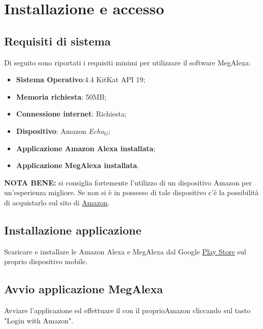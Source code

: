 \chapter{Installazione e accesso}


\section{Requisiti di sistema}
\label{Requisiti sistema}
Di seguito sono riportati i requisiti minimi per utilizzare il software MegAlexa:

\begin{itemize}
	\item \textbf{Sistema Operativo}:4.4 KitKat API 19;
	\item \textbf{Memoria richiesta}: 50MB;
	\item \textbf{Connessione internet}: Richiesta;
	\item \textbf{Dispositivo}: Amazon \textit{Echo$_{G}$};
	\item \textbf{Applicazione Amazon Alexa installata};
	\item \textbf{Applicazione MegAlexa installata}.
\end{itemize}

\textbf{NOTA BENE:} si consiglia fortemente l'utilizzo di un dispositivo Amazon per un'esperienza migliore. Se non si è in possesso di tale dispositivo c'è la possibilità di acquistarlo sul sito di \href{https://www.amazon.it}{Amazon}.

\section{Installazione applicazione}
Scaricare e installare le  Amazon Alexa e MegAlexa dal Google \href{https://play.google.com/store/apps?hl=it}{Play Store} sul proprio dispositivo mobile.
\newpage
\section{Avvio applicazione MegAlexa}
\label{Installazione MegAlexa}
Avviare l'applicazione ed effettuare il con il proprioAmazon cliccando sul tasto "Login with Amazon".

